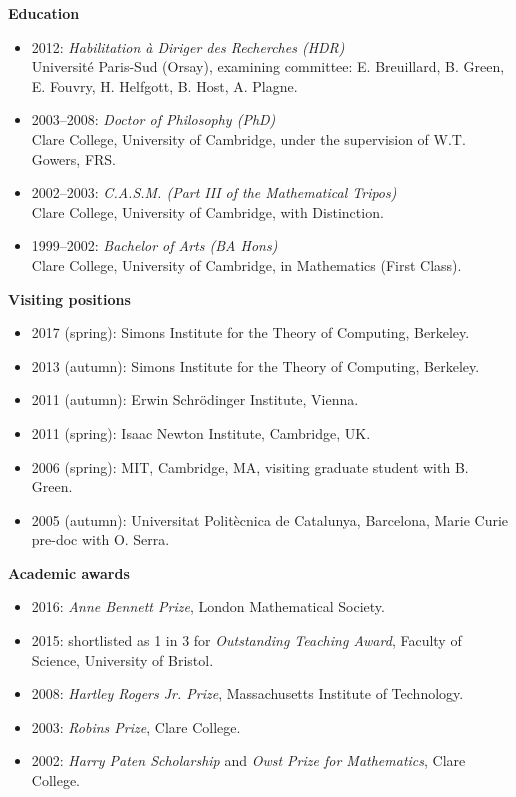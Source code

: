 \documentclass[11pt]{article}
\newenvironment{mitemize}{
\begin{itemize}
  \setlength{\itemsep}{1pt}
  \setlength{\parskip}{0pt}
  \setlength{\parsep}{0pt}
}{\end{itemize}}
\begin{document}
\vspace{2pt}
\textbf{Education}
\begin{mitemize}
\item 2012: \textit{Habilitation \`a Diriger des Recherches (HDR)}\\
Universit\'e Paris-Sud (Orsay), examining committee: E. Breuillard, B. Green, E. Fouvry, H. Helfgott, B. Host, A. Plagne.
\item 2003--2008: \textit{Doctor of Philosophy (PhD)}\\
Clare College, University of Cambridge, under the supervision of W.T. Gowers, FRS.
\item 2002--2003: \textit{C.A.S.M. (Part III of the Mathematical Tripos)}\\
Clare College, University of Cambridge, with Distinction.
\item 1999--2002: \textit{Bachelor of Arts (BA Hons)}\\
Clare College, University of Cambridge, in Mathematics (First Class).
\end{mitemize}


\vspace{2pt}
\textbf{Visiting positions}
\begin{mitemize}
\item 2017 (spring): Simons Institute for the Theory of Computing, Berkeley.
\item 2013 (autumn): Simons Institute for the Theory of Computing, Berkeley.
\item 2011 (autumn): Erwin Schr\"odinger Institute, Vienna.
\item 2011 (spring): Isaac Newton Institute, Cambridge, UK.
\item 2006 (spring): MIT, Cambridge, MA, visiting graduate student with B. Green.
\item 2005 (autumn): Universitat Polit\`ecnica de Catalunya, Barcelona, Marie Curie pre-doc with O. Serra.
\end{mitemize}

\vspace{2pt}
\textbf{Academic awards}
\begin{mitemize}
\item 2016: \textit{Anne Bennett Prize}, London Mathematical Society.
\item 2015: shortlisted as 1 in 3 for \textit{Outstanding Teaching Award}, Faculty of Science, University of Bristol.
\item 2008: \textit{Hartley Rogers Jr. Prize}, Massachusetts Institute of Technology.
\item 2003: \textit{Robins Prize}, Clare College.
\item 2002: \textit{Harry Paten Scholarship} and \textit{Owst Prize for Mathematics}, Clare College.
\end{mitemize}
\end{document}
